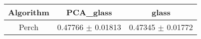 \begin{table}
\begin{center}
\begin{tabular}{|c|c|c|}
\hline
\bf Algorithm & \bf PCA\_glass & \bf glass\\
\hline
Perch & 0.47766 $\pm$ 0.01813 & 0.47345 $\pm$ 0.01772 \\
\hline
\end{tabular}
\end{center}
\end{table}
